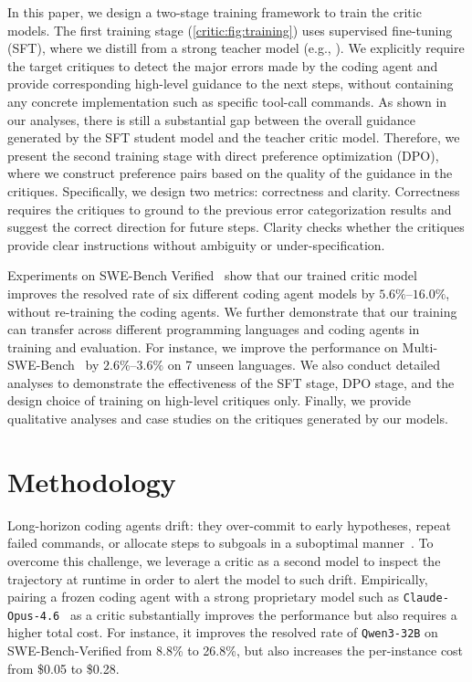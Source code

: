 In this paper, we design a two-stage training framework to train the critic models.
The first training stage (\autoref{critic:fig:training}) uses supervised fine-tuning (SFT), where we distill from a strong teacher model (e.g., \criticopus{}).
We explicitly require the target critiques to detect the major errors made by the coding agent and provide corresponding high-level guidance to the next steps, without containing any concrete implementation such as specific tool-call commands.
As shown in our analyses, there is still a substantial gap between the overall guidance generated by the SFT student model and the teacher critic model.
Therefore, we present the second training stage with direct preference optimization (DPO), where we construct preference pairs based on the quality of the guidance in the critiques.
Specifically, we design two metrics: correctness and clarity.
Correctness requires the critiques to ground to the previous error categorization results and suggest the correct direction for future steps.
Clarity checks whether the critiques provide clear instructions without ambiguity or under-specification.

Experiments on SWE-Bench Verified~\cite{ICLR2024_edac78c3} show that our trained critic model improves the resolved rate of six different coding agent models by $5.6\%$--$16.0\%$, without re-training the coding agents. 
We further demonstrate that our training can transfer across different programming languages and coding agents in training and evaluation.
For instance, we improve the performance on Multi-SWE-Bench~\cite{zan2025multiswebench} by $2.6\%$--$3.6\%$ on 7 unseen languages.
We also conduct detailed analyses to demonstrate the effectiveness of the SFT stage, DPO stage, and the design choice of training on high-level critiques only.
Finally, we provide qualitative analyses and case studies on the critiques generated by our models.


\section{Methodology}
\label{critic:sec:method}

Long-horizon coding agents drift: they over-commit to early hypotheses, repeat failed commands, or allocate steps to subgoals in a suboptimal manner~\cite{gandhi2025sweprm,wang2026rubric}. To overcome this challenge, we leverage a critic as a second model to inspect the trajectory at runtime in order to alert the model to such drift.
Empirically, pairing a frozen coding agent with a strong proprietary model such as \texttt{Claude-Opus-4.6}~\cite{claude46} as a critic substantially improves the performance but also requires a higher total cost.
For instance, it improves the resolved rate of \texttt{Qwen3-32B} on SWE-Bench-Verified from 8.8\% to 26.8\%, but also increases the per-instance cost from \$0.05 to \$0.28.

